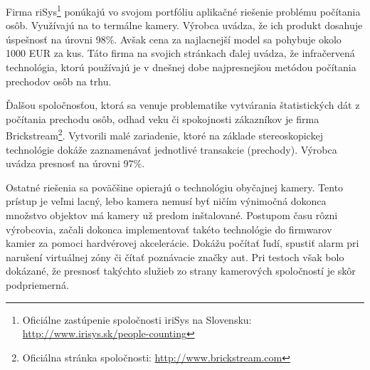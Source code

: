 \vspace{8mm}
 
Firma riSys\footnote{Oficiálne zastúpenie spoločnosti iriSys na Slovensku: \url{http://www.irisys.sk/people-counting}} ponúkajú vo svojom portfóliu aplikačné riešenie problému počítania osôb. Využívajú na to termálne kamery. Výrobca uvádza, že ich produkt dosahuje úspešnosť na úrovni 98\%. Avšak cena za najlacnejší model sa pohybuje okolo 1000 EUR za kus. Táto firma na svojich stránkach ďalej uvádza, že infračervená technológia, ktorú používajú je v dnešnej dobe najpresnejšou metódou počítania prechodov osôb na trhu. 

Ďalšou spoločnosťou, ktorá sa venuje problematike vytvárania štatistických dát z počítania prechodu osôb, odhad veku či spokojnosti zákazníkov je firma Brickstream\footnote{Oficiálna stránka spoločnosti: \url{http://www.brickstream.com}}. Vytvorili malé zariadenie, ktoré na základe stereoskopickej technológie dokáže zaznamenávať jednotlivé transakcie (prechody). Výrobca uvádza presnosť na úrovni 97\%.


Ostatné riešenia sa poväčšine opierajú o technológiu obyčajnej kamery. Tento prístup je veľmi lacný, lebo kamera nemusí byť ničím výnimočná dokonca množstvo objektov má kamery už predom inštalované. Postupom času rôzni výrobcovia, začali dokonca implementovať takéto technológie do firmwarov kamier za pomoci hardvérovej akcelerácie. Dokážu počítať ľudí, spustiť alarm pri narušení virtuálnej zóny či čítať poznávacie značky aut. Pri testoch však bolo dokázané, že presnosť takýchto služieb zo strany kamerových spoločností je skôr podpriemerná. 





